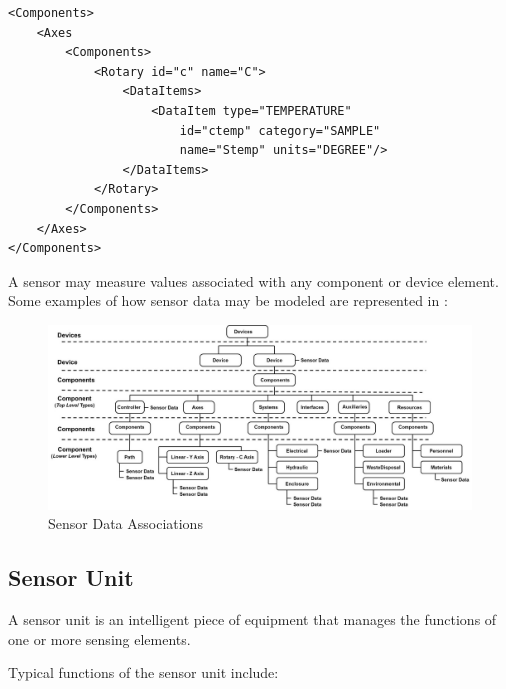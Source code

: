 \begin{lstlisting}[firstnumber=1,escapechar=|,%
    caption={Example of Sensing Element provided as data item associated with a Component}, label={lst:example-of-sensing-element}]
<Components>
    <Axes
        <Components>
            <Rotary id="c" name="C">
                <DataItems>
                    <DataItem type="TEMPERATURE" 
                        id="ctemp" category="SAMPLE" 
                        name="Stemp" units="DEGREE"/>
                </DataItems>
            </Rotary>
        </Components>
    </Axes>
</Components>
\end{lstlisting}

A sensor may measure values associated with any \gls{component} or \gls{device} element.   Some examples of how sensor data may be modeled are represented in :

\begin{figure}[ht]
  \centering
  \includegraphics[width=.75\textwidth]{figures/sensor-data-associations.png}
  \caption{Sensor Data Associations}
  \label{fig:sensor-data-associations}
\end{figure}

\subsection{Sensor Unit}
\label{sec:Sensor Unit}

A \gls{sensor unit} is an intelligent piece of equipment that manages the functions of one or more \glspl{sensing element}.

Typical functions of the \gls{sensor unit} include:

